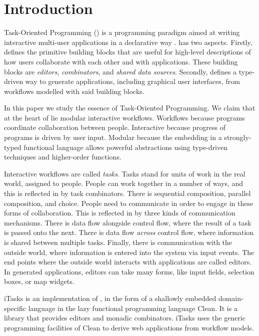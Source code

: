 


\section{Introduction}

Task-Oriented Programming (\TOP) is a programming paradigm aimed at writing interactive multi-user applications in a declarative way \cite{conf/ppdp/PlasmeijerLMAK12}.
\TOP has two aspects.
Firstly, \TOP defines the primitive building blocks that are useful for high-level descriptions of how users collaborate with each other and with applications.
These building blocks are \emph{editors}, \emph{combinators}, and \emph{shared data sources}.
Secondly, \TOP defines a type-driven way to generate applications, including graphical user interfaces, from workflows modelled with said building blocks.

In this paper we study the essence of Task-Oriented Programming.
We claim that at the heart of \TOP lie modular interactive workflows.
Workflows because \TOP programs coordinate collaboration between people.
Interactive because progress of \TOP programs is driven by user input.
Modular because the embedding in a strongly-typed functional language allows powerful abstractions using type-driven techniques and higher-order functions.

Interactive workflows are called \emph{tasks}.
Tasks stand for units of work in the real world, assigned to people.
People can work together in a number of ways, and this is reflected in \TOP by task combinators.
There is sequential composition, parallel composition, and choice.
People need to communicate in order to engage in these forms of collaboration.
This is reflected in \TOP by three kinds of communication mechanisms.
There is data flow alongside control flow, where the result of a task is passed onto the next.
There is data flow \emph{across} control flow, where information is shared between multiple tasks.
Finally, there is communication with the outside world, where information is entered into the system via input events.
The end points where the outside world interacts with \TOP applications are called editors.
In generated applications, editors can take many forms, like input fields, selection boxes, or map widgets.

iTasks is an implementation of \TOP, in the form of a shallowly embedded domain-specific language in the lazy functional programming language Clean.
It is a library that provides editors and monadic combinators.
iTasks uses the generic programming facilities of Clean to derive web applications from workflow models.


